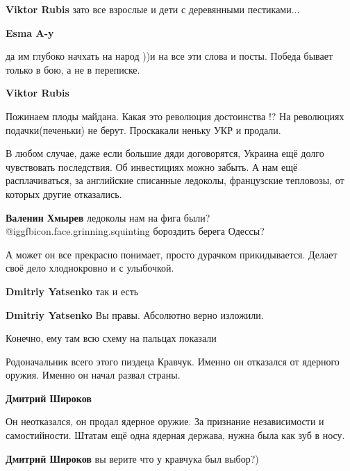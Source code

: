 \begin{itemize}
\begin{itemize}
\textbf{Viktor Rubis} зато все взрослые и дети с деревянными пестиками...

\textbf{Esma A-y} 

да им глубоко начхать на народ ))и на все эти слова и посты. Победа бывает
только в бою, а не в переписке.

\textbf{Viktor Rubis} 

Пожинаем плоды майдана. Какая это революция достоинства !? На революциях
подачки(печеньки) не берут. Проскакали неньку УКР и продали.
\end{itemize} %


В любом случае, даже если большие дяди договорятся, Украина ещё долго чувствовать
последствия. Об инвестициях можно забыть. А нам ещё расплачиваться, за английские
списанные ледоколы, французские тепловозы, от которых другие отказались.

\textbf{Валенин Хмырев} ледоколы нам на фига были?  @igg{fbicon.face.grinning.squinting}  бороздить берега Одессы?


А может он все прекрасно понимает, просто дурачком прикидывается. Делает своё
дело хлоднокровно и с улыбочкой.

\begin{itemize} %
\textbf{Dmitriy Yatsenko} так и есть

\textbf{Dmitriy Yatsenko} Вы правы. Абсолютно верно изложили.

Конечно, ему там всю схему на пальцах показали
\end{itemize} %


Родоначальник всего этого пиздеца Кравчук. Именно он отказался от ядерного
оружия. Именно он начал развал страны.

\begin{itemize} %
\textbf{Дмитрий Широков} 

Он неотказался, он продал ядерное оружие. За признание независимости и
самостийности. Штатам ещё одна ядерная держава, нужна была как зуб в носу.

\textbf{Дмитрий Широков} вы верите что у кравчука был выбор?)



\end{itemize}
\end{itemize}
